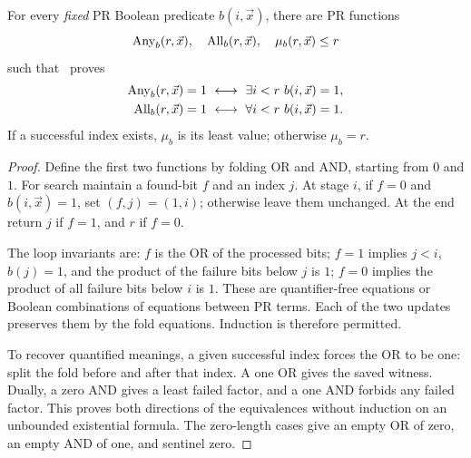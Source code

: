 \begin{lemma}\label{thm:F01}
For every \emph{fixed} PR Boolean predicate $b(i,\vec x)$, there are PR functions
\[
 \operatorname{Any}_b(r,\vec x),\quad \operatorname{All}_b(r,\vec x),\quad \mu_b(r,\vec x)\le r
\]
such that \ipra\ proves
\begin{align*}
 \operatorname{Any}_b(r,\vec x)=1&\ \longleftrightarrow\ \exists i<r\ b(i,\vec x)=1,\\
 \operatorname{All}_b(r,\vec x)=1&\ \longleftrightarrow\ \forall i<r\ b(i,\vec x)=1.
\end{align*}
If a successful index exists, $\mu_b$ is its least value; otherwise $\mu_b=r$.
\end{lemma}
\begin{proof}
Define the first two functions by folding OR and AND, starting from $0$ and $1$. For search maintain a found-bit $f$ and an index $j$. At stage $i$, if $f=0$ and $b(i,\vec x)=1$, set $(f,j)=(1,i)$; otherwise leave them unchanged. At the end return $j$ if $f=1$, and $r$ if $f=0$.

The loop invariants are: $f$ is the OR of the processed bits; $f=1$ implies $j<i$, $b(j)=1$, and the product of the failure bits below $j$ is $1$; $f=0$ implies the product of all failure bits below $i$ is $1$. These are quantifier-free equations or Boolean combinations of equations between PR terms. Each of the two updates preserves them by the fold equations. Induction is therefore permitted.

To recover quantified meanings, a given successful index forces the OR to be one: split the fold before and after that index. A one OR gives the saved witness. Dually, a zero AND gives a least failed factor, and a one AND forbids any failed factor. This proves both directions of the equivalences without induction on an unbounded existential formula. The zero-length cases give an empty OR of zero, an empty AND of one, and sentinel zero.
\end{proof}

